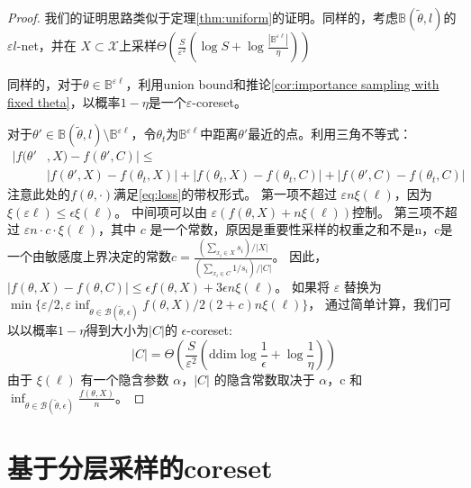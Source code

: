 \begin{proof}
    我们的证明思路类似于定理\ref{thm:uniform}的证明。同样的，考虑$\mathbb{B}(\tilde{\theta},l)$的$\varepsilon l$-net，并在
    $X\subset \mathcal{X}$上采样$\Theta\left(\frac{S}{\varepsilon^2}\left(\log S +\log \frac {\left|\mathbb{B}^{\varepsilon \ell}\right|} {\eta} \right)\right)$

    同样的，对于$\theta \in \mathbb{B}^{\varepsilon \ell}$，利用union bound和推论\ref{cor:importance sampling with fixed theta}，以概率$1-\eta$是一个$\varepsilon$-coreset。

    对于$\theta' \in \mathbb{B}(\tilde{\theta},l)\setminus \mathbb{B}^{\varepsilon \ell}$，令$\theta_t$为$\mathbb{B}^{\varepsilon \ell}$中距离$\theta'$最近的点。利用三角不等式：
    \begin{align*}
        |f(\theta'&,X)-f(\theta',C)|\leq \\
        &|f(\theta',X)-f(\theta_t,X)|+|f(\theta_t,X)-f(\theta_t,C)|+|f(\theta',C)-f(\theta_t,C)|
    \end{align*}
    注意此处的$f(\theta,\cdot)$满足\ref{eq:loss}的带权形式。
    第一项不超过 $\varepsilon n \xi(\ell)$，因为 $\xi(\varepsilon \ell) \leq \epsilon \xi(\ell)$。
    中间项可以由 $\varepsilon (f(\theta, X) + n \xi(\ell))$控制。
    第三项不超过 $\varepsilon n \cdot c \cdot \xi(\ell)$，其中 $c$ 是一个常数，原因是重要性采样的权重之和不是n，c是一个由敏感度上界决定的常数$c=\frac{(\sum_{x_i\in X}s_i)/|X|}{(\sum_{x_i \in C}1/s_i)/|C|}$。
    因此，$|f(\theta, X) - f(\theta, C)| \leq \epsilon f(\theta, X) + 3 \epsilon n \xi(\ell)$。
    如果将 $\varepsilon$ 替换为 $\min \{\varepsilon / 2, \varepsilon \inf_{\theta \in \mathcal{B}(\tilde{\theta}, \epsilon)} f(\theta, X) / 2(2+c)n \xi(\ell)\}$，
    通过简单计算，我们可以以概率$1-\eta$得到大小为$|C|$的 $\epsilon$-coreset:
\begin{equation}
|C| = \Theta \left( \frac{S}{\varepsilon^2} \left( \text{ddim} \log \frac{1}{\epsilon} + \log \frac{1}{\eta} \right) \right)
\end{equation}
由于 $\xi(\ell)$ 有一个隐含参数 $\alpha$，$|C|$ 
的隐含常数取决于 $\alpha$，c 和
$\inf_{\theta \in \mathcal{B}(\tilde{\theta}, \epsilon)} \frac{f(\theta, X)}{n}$。

\end{proof}

\section{基于分层采样的coreset}

